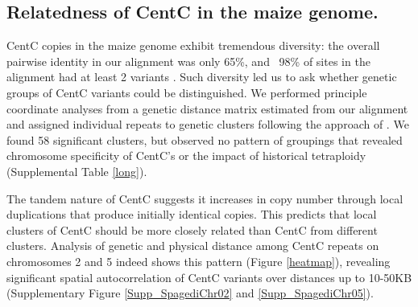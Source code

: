 \subsection*{Relatedness of CentC in the maize genome.}

CentC copies in the maize genome exhibit tremendous diversity: the overall pairwise identity in our alignment was only 65\%, and ~98\% of sites in the alignment had at least 2 variants .  Such diversity led us to ask whether genetic groups of CentC variants could be distinguished. We performed principle coordinate analyses from a genetic distance matrix estimated from our alignment and assigned individual repeats to  genetic clusters following the approach of \citet{Patterson2006}.  We found 58 significant clusters, but observed no pattern of groupings that revealed chromosome specificity of CentC’s or the impact of historical tetraploidy (Supplemental Table \ref{long}).

The tandem nature of CentC suggests it increases in copy number through local duplications that produce initially identical copies.  This predicts that local clusters of CentC should be more closely related than CentC from different clusters.  Analysis of genetic and physical distance among CentC repeats on chromosomes 2 and 5 indeed shows this pattern (Figure \ref{heatmap}), revealing significant spatial autocorrelation of CentC variants over distances up to 10-50KB (Supplementary Figure \ref{Supp_SpagediChr02} and \ref{Supp_SpagediChr05}).

